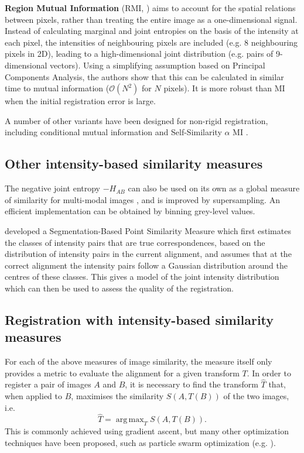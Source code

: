 \documentclass{report}
\DeclareMathOperator*{\argmax}{arg\,max}
\begin{document}
\textbf{Region Mutual Information} (RMI, \cite{russakoff2004image}) aims to account for the spatial relations between pixels, rather than treating the entire image as a one-dimensional signal. Instead of calculating marginal and joint entropies on the basis of the intensity at each pixel, the intensities of neighbouring pixels are included (e.g. 8 neighbouring pixels in 2D), leading to a high-dimensional joint distribution (e.g. pairs of 9-dimensional vectors). Using a simplifying assumption based on Principal Components Analysis, the authors show that this can be calculated in similar time to mutual information ($\mathcal{O}(N^2)$ for $N$ pixels). It is more robust than MI when the initial registration error is large.

A number of other variants have been designed for non-rigid registration, including conditional mutual information \citep{loeckx2010nonrigid} and Self-Similarity $\alpha$ MI \citep{rivaz2014self}.

\subsection{Other intensity-based similarity measures}
The negative joint entropy $-H_{AB}$ can also be used on its own as a global measure of similarity for multi-modal images \citep{collignon19953d}, and is improved by supersampling. An efficient implementation can be obtained by binning grey-level values.

\cite{rogelj2003point} developed a Segmentation-Based Point Similarity Measure which first estimates the classes of intensity pairs that are true correspondences, based on the distribution of intensity pairs in the current alignment, and assumes that at the correct alignment the intensity pairs follow a Gaussian distribution around the centres of these classes. This gives a model of the joint intensity distribution which can then be used to assess the quality of the registration.

\subsection{Registration with intensity-based similarity measures}
For each of the above measures of image similarity, the measure itself only provides a metric to evaluate the alignment for a given transform $T$. In order to register a pair of images $A$ and $B$, it is necessary to find the transform $\hat{T}$ that, when applied to $B$, maximises the similarity $S(A, T(B))$ of the two images, i.e. 
\[
\hat{T}=\argmax_T S(A,T(B)).
\]
This is commonly achieved using gradient ascent, but many other optimization techniques have been proposed, such as particle swarm optimization (e.g. \cite{wachowiak2004approach}).
\end{document}

